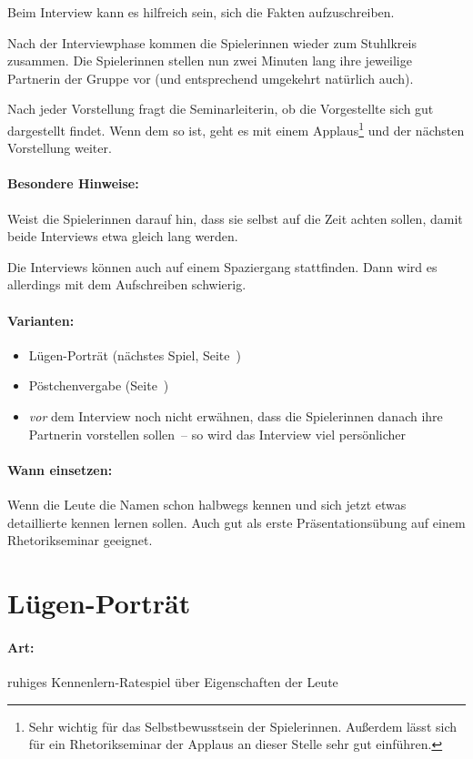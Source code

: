Beim Interview kann es hilfreich sein, sich die Fakten aufzuschreiben.

Nach der Interviewphase kommen die Spielerinnen wieder zum Stuhlkreis zusammen. Die Spielerinnen stellen nun zwei Minuten lang ihre jeweilige Partnerin der Gruppe vor (und entsprechend umgekehrt natürlich auch).

Nach jeder Vorstellung fragt die Seminarleiterin, ob die Vorgestellte sich gut dargestellt findet. Wenn dem so ist, geht es mit einem Applaus\footnote{Sehr wichtig für das Selbstbewusstsein der Spielerinnen. Außerdem lässt sich für ein Rhetorikseminar der Applaus an dieser Stelle sehr gut einführen.} und der nächsten Vorstellung weiter.
\paragraph{Besondere Hinweise:} Weist die Spielerinnen darauf hin, dass sie selbst auf die Zeit achten sollen, damit beide Interviews etwa gleich lang werden.

Die Interviews können auch auf einem Spaziergang stattfinden. Dann wird es allerdings mit dem Aufschreiben schwierig.
\paragraph{Varianten:}
\begin{itemize}
  \item Lügen-Porträt (nächstes Spiel, Seite~\pageref{luegenportrait})
  \item Pöstchenvergabe (Seite~\pageref{poestchenvergabe})
  \item \emph{vor} dem Interview noch nicht erwähnen, dass die Spielerinnen danach ihre Partnerin vorstellen sollen~-- so wird das Interview viel persönlicher
\end{itemize}

\paragraph{Wann einsetzen:} Wenn die Leute die Namen schon halbwegs kennen und sich jetzt etwas detaillierte kennen lernen sollen. Auch gut als erste Präsentationsübung auf einem Rhetorikseminar geeignet.

\section{Lügen-Porträt}
\label{luegenportrait}
\paragraph{Art:} ruhiges Kennenlern-Ratespiel über Eigenschaften der Leute
